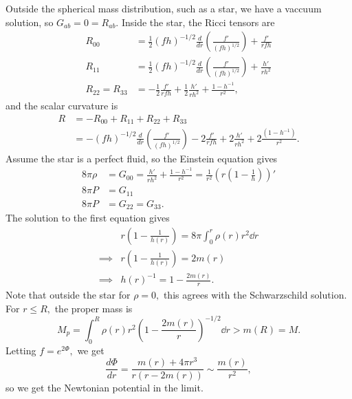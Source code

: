 \documentclass{article}
\numberwithin{equation}{section}
\begin{document}
Outside the spherical mass distribution, such as a star, we have a vaccuum solution, so $G_{ab}=0= R_{ab}.$ Inside the star, the Ricci tensors are 
\begin{align*}
    R_{00} &= \frac{1}{2}(fh)^{-1/2} \frac{d}{dr}\left(\frac{f'}{(fh)^{1/2}}\right) + \frac{f'}{rfh} \\ 
    R_{11} &= \frac{1}{2}(fh)^{-1/2} \frac{d}{dr}\left(\frac{f'}{(fh)^{1/2}}\right) + \frac{h'}{rh^2} \\ 
    R_{22} = R_{33} &= -\frac{1}{2}\frac{f'}{rfh} + \frac{1}{2}\frac{h'}{rh^2} + \frac{1-h^{-1}}{r^2},
\end{align*}
and the scalar curvature is
\begin{align*}
    R &= -R_{00} + R_{11} + R_{22} + R_{33} \\ 
    &= -(fh)^{-1/2}\frac{d}{dr}\left(\frac{f'}{(fh)^{1/2}}\right) - 2\frac{f'}{rfh} + 2\frac{h'}{rh^2} + 2\frac{(1-h^{-1})}{r^2}.
\end{align*}
Assume the star is a perfect fluid, so the Einstein equation gives 
\begin{align*}
    8\pi\rho &= G_{00} = \frac{h'}{rh^2} + \frac{1-h^{-1}}{r^2} = \frac{1}{r^2}\left(r\left(1 - \frac{1}{h}\right)\right)'\\ 
    8\pi P &= G_{11} \\ 
    8\pi P&= G_{22} = G_{33}.
\end{align*}
The solution to the first equation gives 
\begin{align*}
    & r\left(1 - \frac{1}{h(r)}\right) = 8\pi \int_0^r \rho(r) r^2 \dd{r} \\ 
\implies & r\left(1 - \frac{1}{h(r)}\right) = 2m(r) \\ 
\implies & h(r)^{-1} = 1 - \frac{2m(r)}{r}.
\end{align*}
Note that outside the star for $\rho = 0,$ this agrees with the Schwarzschild solution. For $r\le R,$ the proper mass is
\begin{equation*}
    M_p = \int_0^R \rho(r) r^2 \left(1- \frac{2m(r)}{r}\right)^{-1/2}\dd{r} > m(R) = M.
\end{equation*}
Letting $f=e^{2\Phi},$ we get 
\begin{equation*}
    \frac{d\Phi}{dr} = \frac{m(r) + 4\pi r^3}{r(r-2m(r))} \sim\frac{m(r)}{r^2},
\end{equation*}
so we get the Newtonian potential in the limit.
\end{document}
